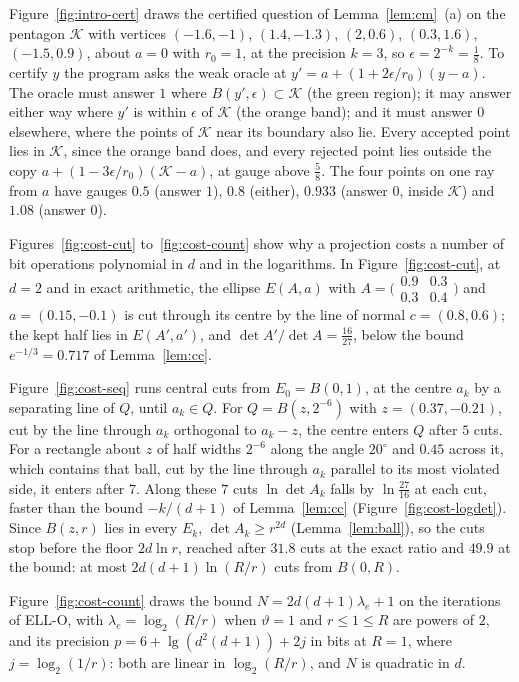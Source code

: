\documentclass[11pt]{amsart}
\theoremstyle{definition}
\numberwithin{equation}{section}
\newcommand{\cK}{\mathcal{K}}
\begin{document}
Figure~\ref{fig:intro-cert} draws the certified question of Lemma~\ref{lem:cm}~(a) on the pentagon $\cK$ with vertices $(-1.6,-1)$, $(1.4,-1.3)$, $(2,0.6)$, $(0.3,1.6)$, $(-1.5,0.9)$, about $a=0$ with $r_0=1$, at the precision $k=3$, so $\epsilon=2^{-k}=\frac18$. To certify $y$ the program asks the weak oracle at $y'=a+(1+2\epsilon/r_0)(y-a)$. The oracle must answer $1$ where $B(y',\epsilon)\subset\cK$ (the green region); it may answer either way where $y'$ is within $\epsilon$ of $\cK$ (the orange band); and it must answer $0$ elsewhere, where the points of $\cK$ near its boundary also lie. Every accepted point lies in $\cK$, since the orange band does, and every rejected point lies outside the copy $a+(1-3\epsilon/r_0)(\cK-a)$, at gauge above $\frac58$. The four points on one ray from $a$ have gauges $0.5$ (answer $1$), $0.8$ (either), $0.933$ (answer $0$, inside $\cK$) and $1.08$ (answer $0$).

Figures~\ref{fig:cost-cut} to~\ref{fig:cost-count} show why a projection costs a number of bit operations polynomial in $d$ and in the logarithms. In Figure~\ref{fig:cost-cut}, at $d=2$ and in exact arithmetic, the ellipse $E(A,a)$ with $A=\bigl(\begin{smallmatrix}0.9&0.3\\0.3&0.4\end{smallmatrix}\bigr)$ and $a=(0.15,-0.1)$ is cut through its centre by the line of normal $c=(0.8,0.6)$; the kept half lies in $E(A',a')$, and $\det A'/\det A=\frac{16}{27}$, below the bound $e^{-1/3}=0.717$ of Lemma~\ref{lem:cc}.

Figure~\ref{fig:cost-seq} runs central cuts from $E_0=B(0,1)$, at the centre $a_k$ by a separating line of $Q$, until $a_k\in Q$. For $Q=B(z,2^{-6})$ with $z=(0.37,-0.21)$, cut by the line through $a_k$ orthogonal to $a_k-z$, the centre enters $Q$ after $5$ cuts. For a rectangle about $z$ of half widths $2^{-6}$ along the angle $20^\circ$ and $0.45$ across it, which contains that ball, cut by the line through $a_k$ parallel to its most violated side, it enters after $7$. Along these $7$ cuts $\ln\det A_k$ falls by $\ln\frac{27}{16}$ at each cut, faster than the bound $-k/(d+1)$ of Lemma~\ref{lem:cc} (Figure~\ref{fig:cost-logdet}). Since $B(z,r)$ lies in every $E_k$, $\det A_k\ge r^{2d}$ (Lemma~\ref{lem:ball}), so the cuts stop before the floor $2d\ln r$, reached after $31.8$ cuts at the exact ratio and $49.9$ at the bound: at most $2d(d+1)\ln(R/r)$ cuts from $B(0,R)$.

Figure~\ref{fig:cost-count} draws the bound $N=2d(d+1)\lambda_e+1$ on the iterations of ELL-O, with $\lambda_e=\log_2(R/r)$ when $\vartheta=1$ and $r\le1\le R$ are powers of $2$, and its precision $p=6+\lg(d^2(d+1))+2j$ in bits at $R=1$, where $j=\log_2(1/r)$: both are linear in $\log_2(R/r)$, and $N$ is quadratic in $d$.
\end{document}
